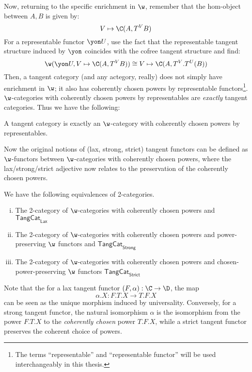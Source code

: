 Now, returning to the specific enrichment in $\w$, remember that the hom-object between $A, B$ is given by:
\[
	V \mapsto \C(A,T^V B)
\]
For a representable functor $\yon U$, use the fact that the representable tangent structure induced by $\yon$ coincides with the cofree tangent structure and find:
\[
	\w(\yon U, V \mapsto \C(A, T^VB)) \cong V \mapsto \C(A, T^V.T^U(B))
\]
Then, a tangent category (and any actegory, really) does not simply have enrichment in $\w$; it also has coherently chosen powers by representable functors\footnote{The terms ``representable'' and ``representable functor'' will be used interchangeably in this thesis.}. $\w$-categories with coherently chosen powers by representables are \emph{exactly} tangent categories. Thus we have the following:
\begin{proposition}
	A tangent category is exactly an $\w$-category with coherently chosen powers by representables.
\end{proposition}
Now the original notions of (lax, strong, strict) tangent functors can be defined as $\w$-functors between $\w$-categories with coherently chosen powers, where the lax/strong/strict adjective now relates to the preservation of the coherently chosen powers.
\begin{theorem}\label{thm:2-cat-tangcat}
	We have the following equivalences of 2-categories.
	\begin{enumerate}[(i)]
		\item The 2-category of $\w$-categories with coherently chosen powers and $\mathsf{TangCat}_{\mathsf{Lax}}$
		\item The 2-category of $\w$-categories with coherently chosen powers and power-preserving $\w$ functors  and $\mathsf{TangCat}_{\mathsf{Strong}}$
		\item The 2-category of $\w$-categories with coherently chosen powers and chosen-power-preserving $\w$ functors $\mathsf{TangCat}_{\mathsf{Strict}}$
	\end{enumerate}
\end{theorem}
Note that the for a lax tangent functor $(F,\alpha): \C \to \D$, the map
\[
	\alpha.X: F.T.X \to T.F.X
\] can be seen as the unique morphism induced by universality. Conversely, for a strong tangent functor, the natural isomorphism $\alpha$ is the isomorphism from the power $F.T.X$ to the \emph{coherently chosen} power $T.F.X$, while a strict tangent functor preserves the coherent choice of powers.

